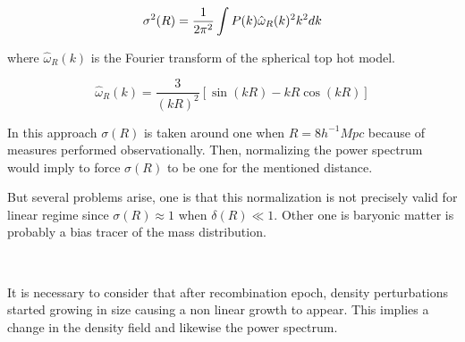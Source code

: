 \[
\sigma^2(R) = \frac{1}{2\pi^2} \int P(k)\hat{\omega}_R(k)^2k^2 dk
\]

where $\hat{\omega}_R(k)$ is the Fourier transform of the spherical top hot model.

\[\hat{\omega}_R(k) = \frac{3}{(k R)^2}[\sin(kR)-kR\cos(k R)]\]
 
In this approach $\sigma(R)$ is taken around one when $R=8h^{-1}Mpc$ because of 
measures performed observationally. 
Then, normalizing the power spectrum would imply to force $\sigma(R)$ to be one 
for the mentioned distance.

But several problems arise, one is that this normalization is not precisely valid
for linear regime since $\sigma(R)\approx 1$ when $\delta(R)\ll 1$. Other one is
baryonic matter is probably a bias tracer of the mass distribution. 

\

It is necessary to consider that after recombination epoch, density perturbations started
growing in size causing a non linear growth to appear. This implies a change in the 
density field and likewise the power spectrum. 






